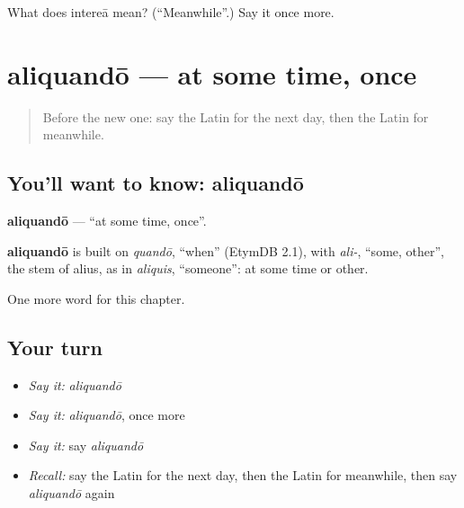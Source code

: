 \begin{tcolorbox}[breakable,colback=teal!4,colframe=teal!35!black,title={Before you move on}]
What does intereā mean? (\textquotedblleft{}Meanwhile\textquotedblright{}.) Say it once more.
\end{tcolorbox}
\section[aliquandō]{aliquandō — at some time, once}

\label{lesson:LA-C263-aliquando}



\begin{quote}
Before the new one: say the Latin for the next day, then the Latin for meanwhile.
\end{quote}

\subsection*{You'll want to know: aliquandō}
\textbf{aliquandō} — \textquotedblleft{}at some time, once\textquotedblright{}.

\begin{cousinweb}
\textbf{aliquandō} is built on \emph{quandō}, \textquotedblleft{}when\textquotedblright{} (EtymDB 2.1), with \emph{ali-}, \textquotedblleft{}some, other\textquotedblright{}, the stem of alius, as in \emph{aliquis}, \textquotedblleft{}someone\textquotedblright{}: at some time or other.
\end{cousinweb}

\begin{grammarlens}[title={What you've built}]
One more word for this chapter.
\end{grammarlens}

\subsection*{Your turn}
\begin{itemize}
\raggedright
  \item \emph{Say it:} \emph{aliquandō}
  \item \emph{Say it:} \emph{aliquandō}, once more
  \item \emph{Say it:} say \emph{aliquandō}
  \item \emph{Recall:} say the Latin for the next day, then the Latin for meanwhile, then say \emph{aliquandō} again
\end{itemize}

